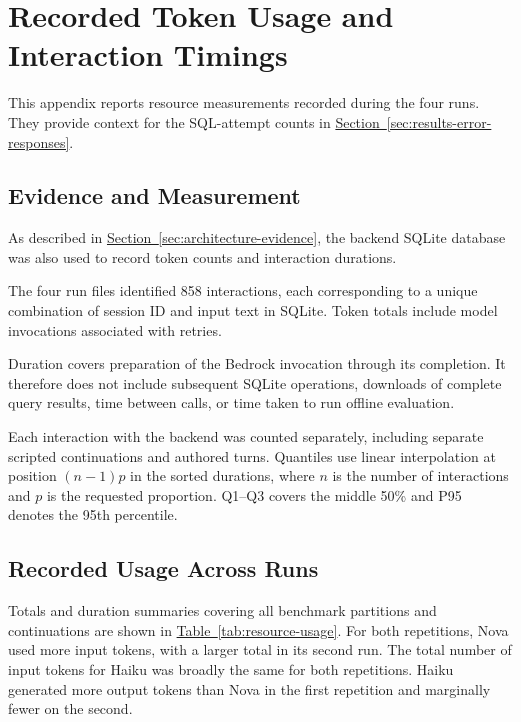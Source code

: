 \clearpage
\section{Recorded Token Usage and Interaction Timings}
\label{app:resource-usage}

This appendix reports resource measurements recorded during the four runs.
They provide context for the SQL-attempt counts in
\hyperref[sec:results-error-responses]{Section~\ref*{sec:results-error-responses}}.

\subsection{Evidence and Measurement}

As described in 
\hyperref[sec:architecture-evidence]{Section~\ref*{sec:architecture-evidence}}, 
the backend SQLite database 
was also used to record token counts and interaction durations.

The four run files identified 858 interactions, 
each corresponding to a unique combination of session ID and input text in SQLite. 
Token totals include model invocations associated with retries.

Duration covers preparation of the Bedrock invocation through its completion.
It therefore does not include subsequent SQLite operations, 
downloads of complete query results, time between calls, 
or time taken to run offline evaluation. 

Each interaction with the backend was counted separately, 
including separate scripted continuations and authored turns.
Quantiles use linear interpolation at position $(n-1)p$
in the sorted durations, where $n$ is the number of interactions 
and $p$ is the requested proportion. 
Q1--Q3 covers the middle 50\% and P95 denotes the 95th percentile.

\subsection{Recorded Usage Across Runs}

Totals and duration summaries covering all benchmark partitions and continuations are shown in 
\hyperref[tab:resource-usage]{Table~\ref*{tab:resource-usage}}. 
For both repetitions, Nova used more input tokens, 
with a larger total in its second run. 
The total number of input tokens for Haiku was broadly the same for both repetitions. 
Haiku generated more output tokens than Nova in the first repetition and marginally fewer on the second.

